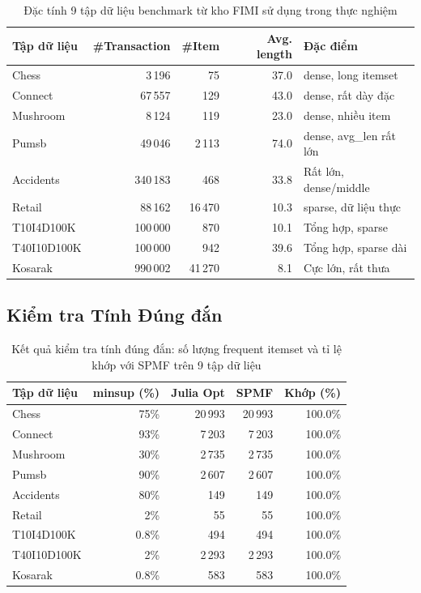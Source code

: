 \documentclass[12pt,a4paper]{article}
\theoremstyle{definition}
\begin{document}
\begin{table}[H]
\centering
\small
\begin{tabular}{l r r r l}
    \toprule
    \textbf{Tập dữ liệu} & \textbf{\#Transaction} & \textbf{\#Item} & \textbf{Avg. length} & \textbf{Đặc điểm} \\
    \midrule
    Chess        & 3\,196    & 75      & 37.0 & \gls{dense}, long itemset \\
    Connect      & 67\,557   & 129     & 43.0 & \gls{dense}, rất dày đặc \\
    Mushroom     & 8\,124    & 119     & 23.0 & \gls{dense}, nhiều item \\
    Pumsb        & 49\,046   & 2\,113  & 74.0 & \gls{dense}, avg\_len rất lớn \\
    Accidents    & 340\,183  & 468     & 33.8 & Rất lớn, dense/middle \\
    Retail       & 88\,162   & 16\,470 & 10.3 & \gls{sparse}, dữ liệu thực \\
    T10I4D100K   & 100\,000  & 870     & 10.1 & Tổng hợp, sparse \\
    T40I10D100K  & 100\,000  & 942     & 39.6 & Tổng hợp, sparse dài \\
    Kosarak      & 990\,002  & 41\,270 & 8.1  & Cực lớn, rất thưa \\
    \bottomrule
\end{tabular}
\caption{Đặc tính 9 tập dữ liệu benchmark từ kho FIMI sử dụng trong thực nghiệm}
\label{tab:datasets}
\end{table}

\subsection{Kiểm tra Tính Đúng đắn}

\begin{table}[H]
\centering
\small
\begin{tabular}{l r r r r}
    \toprule
    \textbf{Tập dữ liệu} & \textbf{minsup (\%)} & \textbf{Julia Opt} & \textbf{SPMF} & \textbf{Khớp (\%)} \\
    \midrule
    Chess        & 75\%   & 20\,993 & 20\,993 & 100.0\% \\
    Connect      & 93\%   & 7\,203  & 7\,203  & 100.0\% \\
    Mushroom     & 30\%   & 2\,735  & 2\,735  & 100.0\% \\
    Pumsb        & 90\%   & 2\,607  & 2\,607  & 100.0\% \\
    Accidents    & 80\%   & 149     & 149     & 100.0\% \\
    Retail       & 2\%    & 55      & 55      & 100.0\% \\
    T10I4D100K   & 0.8\%  & 494     & 494     & 100.0\% \\
    T40I10D100K  & 2\%    & 2\,293  & 2\,293  & 100.0\% \\
    Kosarak      & 0.8\%  & 583     & 583     & 100.0\% \\
    \bottomrule
\end{tabular}
\caption{Kết quả kiểm tra tính đúng đắn: số lượng frequent itemset và tỉ lệ khớp với SPMF trên 9 tập dữ liệu}
\label{tab:correctness}
\end{table}
\end{document}
